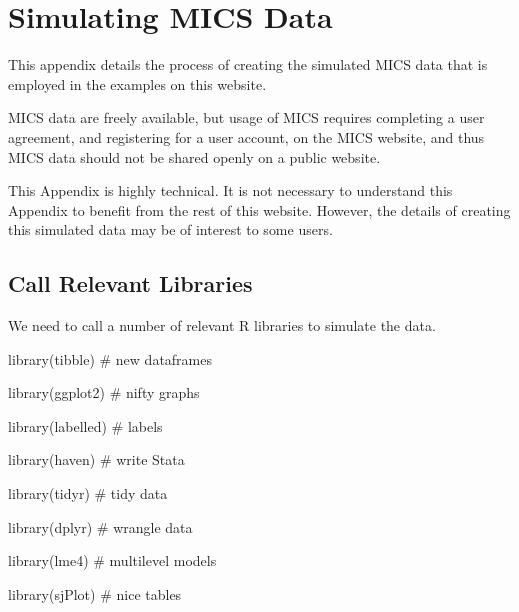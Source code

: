 \documentclass[
  letterpaper,
  DIV=11,
  numbers=noendperiod]{scrreprt}
\newenvironment{Shaded}{\begin{snugshade}}{\end{snugshade}}
\newcommand{\CommentTok}[1]{\textcolor[rgb]{0.37,0.37,0.37}{#1}}
\newcommand{\FunctionTok}[1]{\textcolor[rgb]{0.28,0.35,0.67}{#1}}
\newcommand{\NormalTok}[1]{\textcolor[rgb]{0.00,0.23,0.31}{#1}}
\begin{document}
\cleardoublepage
{}
{}
\appendix

\hypertarget{simulating-mics-data}{%
\chapter{Simulating MICS Data}\label{simulating-mics-data}}

This appendix details the process of creating the simulated MICS data
that is employed in the examples on this website.

MICS data are freely available, but usage of MICS requires completing a
user agreement, and registering for a user account, on the MICS website,
and thus MICS data should not be shared openly on a public website.

This Appendix is highly technical. It is not necessary to understand
this Appendix to benefit from the rest of this website. However, the
details of creating this simulated data may be of interest to some
users.

\hypertarget{call-relevant-libraries}{%
\section{Call Relevant Libraries}\label{call-relevant-libraries}}

We need to call a number of relevant R libraries to simulate the data.

\begin{Shaded}
\begin{Highlighting}[]
\FunctionTok{library}\NormalTok{(tibble) }\CommentTok{\# new dataframes}

\FunctionTok{library}\NormalTok{(ggplot2) }\CommentTok{\# nifty graphs}

\FunctionTok{library}\NormalTok{(labelled) }\CommentTok{\# labels}

\FunctionTok{library}\NormalTok{(haven) }\CommentTok{\# write Stata}

\FunctionTok{library}\NormalTok{(tidyr) }\CommentTok{\# tidy data}

\FunctionTok{library}\NormalTok{(dplyr) }\CommentTok{\# wrangle data}

\FunctionTok{library}\NormalTok{(lme4) }\CommentTok{\# multilevel models}

\FunctionTok{library}\NormalTok{(sjPlot) }\CommentTok{\# nice tables}
\end{Highlighting}
\end{Shaded}
\end{document}
